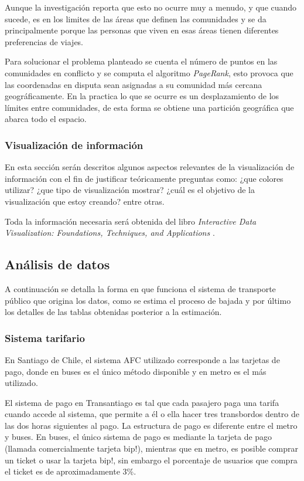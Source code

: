 \documentclass[12pt]{article}
\begin{document}
Aunque la investigación reporta que esto no ocurre muy a menudo, y que cuando sucede, es en los limites de las áreas que definen las comunidades y se da principalmente porque las personas que viven en esas áreas tienen diferentes preferencias de viajes.

Para solucionar el problema planteado se cuenta el número de puntos en las comunidades en conflicto y se computa el algoritmo \textit{PageRank}, esto provoca que las coordenadas en disputa sean asignadas a su comunidad más cercana geográficamente. En la practica lo que se ocurre es un desplazamiento de los límites entre comunidades, de esta forma se obtiene una partición geográfica que abarca todo el espacio.
    
	\subsubsection{Visualización de información}    

	En esta sección serán descritos algunos aspectos relevantes de la visualización de información con el fin de justificar teóricamente preguntas como: ¿que colores utilizar? ¿que tipo de visualización mostrar? ¿cuál es el objetivo de la visualización que estoy creando? entre otras. 
	
	Toda la información necesaria será obtenida del libro \textit{Interactive Data Visualization: Foundations, Techniques, and Applications} \cite{libro_visualizacion}.
    
    \subsection{Análisis de datos}\label{sec:Analisis_datos}

	A continuación se detalla la forma en que funciona el sistema de transporte público que origina los datos, como se estima el proceso de bajada y por último los detalles de las tablas obtenidas posterior a la estimación.
	
	\subsubsection{Sistema tarifario}
En Santiago de Chile, el sistema AFC utilizado corresponde a las tarjetas de pago, donde en buses es el único método disponible y en metro es el más utilizado.

El sistema de pago en Transantiago es tal que cada pasajero paga una tarifa cuando accede al sistema, que permite a él o ella hacer tres transbordos dentro de las dos horas siguientes al pago. La estructura de pago es diferente entre el metro y buses. En buses, el único sistema de pago es mediante la tarjeta de pago (llamada comercialmente tarjeta bip!), mientras que en metro, es posible comprar un ticket o usar la tarjeta bip!, sin embargo el porcentaje de usuarios que compra el ticket es de aproximadamente 3\%.
\end{document}
